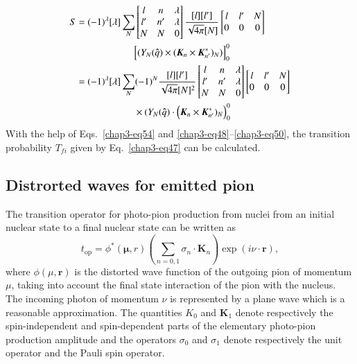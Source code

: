 \begin{align}
  S & = (-1)^\lambda [\lambda] \sum_{N} \begin{bmatrix} l & n & \lambda\\ l' & n' & \lambda\\ N & N & 0  \end{bmatrix}
  \frac{[l][l']}{\sqrt{4 \pi}[N]} \begin{bmatrix}l & l' & N\\ 0 & 0 & 0  \end{bmatrix}\notag \\
       & \qquad \qquad \qquad \Bigl[(Y_N ({\boldsymbol \hat{q}}) \times ({\boldsymbol K}_n \times {\boldsymbol K_{n'}^\ast})_N)\Bigr]_0^0\notag \\
  & = (-1)^\lambda [\lambda] \sum_{N} (-1)^N  \frac{[l][l']}{\sqrt{4 \pi}[N]^2}
  \begin{bmatrix} l & n & \lambda\\ l' & n' & \lambda\\ N & N & 0  \end{bmatrix}
  \begin{bmatrix}l & l' & N\\ 0 & 0 & 0  \end{bmatrix} \notag \\
  & \qquad \qquad \qquad \times (Y_N ({\boldsymbol \hat{q}}) \cdot  \Bigl({\boldsymbol K}_n \times {\boldsymbol K_{n'}^\ast})_N\Bigr)_0^0\label{chap3-eq54}
\end{align}
With the help of Eqs.\ \eqref{chap3-eq54} and \eqref{chap3-eq48}--\eqref{chap3-eq50}, the transition probability $T_{fi}$ given by Eq.\ \eqref{chap3-eq47} can be calculated.

\subsection{Distrorted waves for emitted pion} \label{chap3-sec5.2}

The transition operator for photo-pion production from nuclei from an initial nuclear state to a final nuclear state can be written as
\begin{equation}
t_{\text{op}} = \phi^\ast ({\boldsymbol \mu, r}) \left( \sum_{n=0, 1} \sigma_n \cdot {\boldsymbol K}_n\right) \exp (i \nu \cdot {\boldsymbol r}), \label{chap3-eq55}
\end{equation}
where $\phi (\mu, {\boldsymbol r})$ is the distorted wave function of the outgoing pion of momentum $\mu$, taking into account the final state interaction of the pion with the nucleus. The incoming photon of momentum $\nu$ is represented by a plane wave which is a reasonable approximation. The quantities $K_0$ and ${\boldsymbol K}_1$ denote respectively the spin-independent and spin-dependent parts of the elementary photo-pion production amplitude and the operators $\sigma_0$ and $\sigma_1$ denote respectively the unit operator and the Pauli spin operator.

